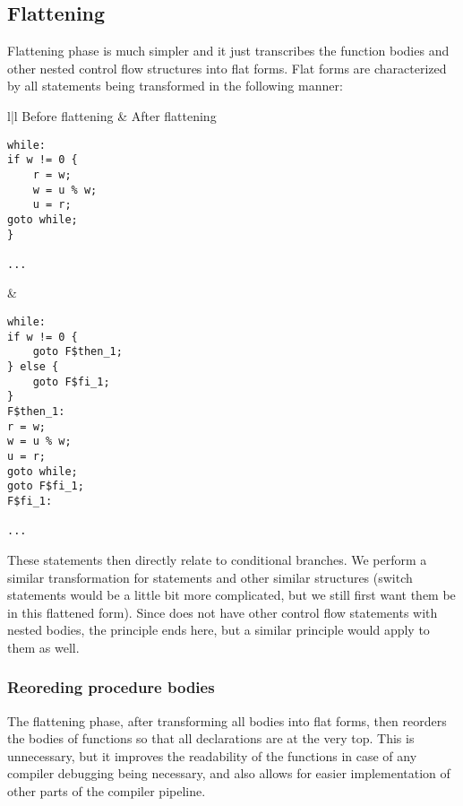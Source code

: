 \subsection{Flattening}

Flattening phase is much simpler and it just transcribes the function bodies and other nested control flow structures into flat forms. Flat forms are characterized by all  statements being transformed in the following manner:

\begin{ex}

    \begin{center}
        \begin{tabular}{l|l}
            Before flattening & After flattening \\
            \hline
            \begin{lstlisting}
while:
if w != 0 {
    r = w;
    w = u % w;
    u = r;
goto while;
}

...
            \end{lstlisting} &
            \begin{lstlisting}
while:
if w != 0 {
    goto F$then_1;
} else {
    goto F$fi_1;
}
F$then_1:
r = w;
w = u % w;
u = r;
goto while;
goto F$fi_1;
F$fi_1:

...
            \end{lstlisting}
        \end{tabular}
    \end{center}
\end{ex}

These  statements then directly relate to conditional branches. We perform a similar transformation for  statements and other similar structures (switch statements would be a little bit more complicated, but we still first want them be in this flattened form). Since \cmm{} does not have other control flow statements with nested bodies, the principle ends here, but a similar principle would apply to them as well.

\subsubsection{Reoreding procedure bodies}

The flattening phase, after transforming all bodies into flat forms, then reorders the bodies of functions so that all declarations are at the very top. This is unnecessary, but it improves the readability of the functions in case of any compiler debugging being necessary, and also allows for easier implementation of other parts of the compiler pipeline.

